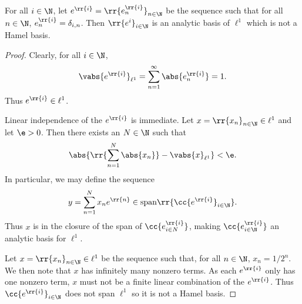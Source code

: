 \documentclass{article}
\begin{document}
\begin{claim*}[8]
	For all $i\in\N$, let $e^{\rr{i}}=\rr{e^{\rr{i}}_n}_{n\in\N}$ be the sequence such that
	for all $n\in\N$, $e_n^{\rr{i}}=\delta_{i,n}$. Then $\rr{e^{i}}_{i\in\N}$ is an analytic basis
	of $\ell^1$ which is not a Hamel basis.
	\begin{proof}
		Clearly, for all $i\in\N$,
		\begin{align*}
			\vabs{e^{\rr{i}}}_{\ell^1} = \sum_{n=1}^{\infty} \abs{e^{\rr{i}}_n} = 1.
		\end{align*}
		Thus $e^{\rr{i}}\in \ell^1$.

		Linear independence of the $e^{\rr{i}}$ is immediate. Let $x=\rr{x_n}_{n\in\N}\in\ell^1$ and let
		$\e>0$. Then there exists an $N\in\N$ such that
		\begin{align*}
			\abs{\rr{\sum_{n=1}^{N} \abs{x_n}} - \vabs{x}_{\ell^1}} < \e.
		\end{align*}
		In particular, we may define the sequence
		\begin{align*}
			y= \sum_{n=1}^{N} x_n e^{\rr{n}} \in\text{span}\rr{\cc{e^{\rr{i}}}_{i\in\N}}.
		\end{align*}
		Thus $x$ is in the closure of the span of $\cc{e^{\rr{i}}_{i\in N}}$, making $\cc{e^{\rr{i}}_{i\in\N}}$
		an analytic basis for $\ell^1$.

		Let $x=\rr{x_n}_{n\in\N}\in\ell^1$ be the sequence such that, for all $n\in\N$, $x_n=1/2^n$.
		We then note that $x$ has infinitely many nonzero terms. As each $e^{\rr{i}}$ only has
		one nonzero term, $x$ must not be a finite linear combination of the $e^{\rr{i}}$. Thus
		$\cc{e^{\rr{i}}}_{i\in\N}$ does not span $\ell^1$ so it is not a Hamel basis.
	\end{proof}
\end{claim*}
\end{document}
